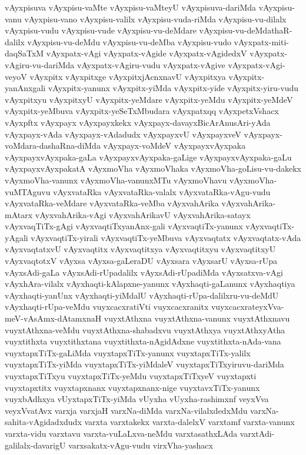 {vAyxpisuva
vAyxpisu-vaMte
vAyxpisu-vaMteyU
vAyxpisuva-dariMda
vAyxpisu-vanu
vAyxpisu-vano
vAyxpisu-valilx
vAyxpisu-vuda-riMda
vAyxpisu-vu-dilalx
vAyxpisu-vudu
vAyxpisu-vude
vAyxpisu-vu-deMdare
vAyxpisu-vu-deMdathaR-dalilx
vAyxpisu-vu-deMdu
vAyxpisu-vu-deMba
vAyxpisu-vudo
vAyxpatx-miti-daqSaTxM
vAyxpatx-vAgi
vAyxpatx-vAgide
vAyxpatx-vAgidedxV
vAyxpatx-vAgiru-vu-dariMda
vAyxpatx-vAgiru-vudu
vAyxpatx-vAgive
vAyxpatx-vAgi-veyoV
vAyxpitx
vAyxpitxge
vAyxpitxjAcnxnavU
vAyxpitxya
vAyxpitx-yanAnxgali
vAyxpitx-yanunx
vAyxpitx-yiMda
vAyxpitx-yide
vAyxpitx-yiru-vudu
vAyxpitxyu
vAyxpitxyU
vAyxpitx-yeMdare
vAyxpitx-yeMdu
vAyxpitx-yeMdeV
vAyxpitx-yeMbuva
vAyxpitx-yeSeTxMbudara
vAyxpatxqq
vAyxpetxVshacx
vAyxpftx
vAyxpayx
vAyxpayxkekx
vAyxpayx-davayxBicArAnusAri-yAda
vAyxpayx-vAda
vAyxpayx-vAdadudx
vAyxpayxvU
vAyxpayxveV
vAyxpayx-voMdara-dashaRna-diMda
vAyxpayx-voMdeV
vAyxpayxvAyxpaka
vAyxpayxvAyxpaka-gaLa
vAyxpayxvAyxpaka-gaLige
vAyxpayxvAyxpaka-gaLu
vAyxpayxvAyxpakatA
vAyxmoVha
vAyxmoVhaka
vAyxmoVha-goLisu-vu-dakekx
vAyxmoVha-vanunx
vAyxmoVha-vanunxMTu
vAyxmoVhavu
vAyxmoVha-vuMTAguvu
vAyxvataRka
vAyxvataRka-valalx
vAyxvataRka-vAgu-vudu
vAyxvataRka-veMdare
vAyxvataRka-veMba
vAyxvahArika
vAyxvahArika-mAtarx
vAyxvahArika-vAgi
vAyxvahArikavU
vAyxvahArika-satayx
vAyxvaqTiTx-gAgi
vAyxvaqtiTxyanAnx-gali
vAyxvaqtiTx-yanunx
vAyxvaqtiTx-yAgali
vAyxvaqtiTx-yirali
vAyxvaqtiTx-yeMbuva
vAyxvaqtatx
vAyxvaqtatx-vAda
vAyxvaqtatxvU
vAyxvaqtitx
vAyxvaqtitxya
vAyxvaqtitxyu
vAyxvaqtitxyU
vAyxvaqtotxV
vAyxsa
vAyxsa-gaLeraDU
vAyxsara
vAyxsarU
vAyxsa-rUpa
vAyxsAdi-gaLa
vAyxsAdi-rUpadalilx
vAyxsAdi-rUpadiMda
vAyxsatxva-vAgi
vAyxhAra-vilalx
vAyxhaqti-kAlapxne-yanunx
vAyxhaqti-gaLanunx
vAyxhaqtiya
vAyxhaqti-yanUnx
vAyxhaqti-yiMdalU
vAyxhaqti-rUpa-dalilxru-vu-deMdU
vAyxhaqti-rUpa-veMdu
vuyxcacxratiVti
vuyxcacxranitx
vuyxcacxrateyxVva-meV-vAsAmx-dAtamxnaH
vuyxtAthxna
vuyxtAthxna-vanunx
vuyxtAthxnavu
vuyxtAthxna-veMdu
vuyxtAthxna-shabadxvu
vuyxtAthxya
vuyxtAthxyAtha
vuyxtithxta
vuyxtithxtana
vuyxtithxta-nAgidAdxne
vuyxtithxta-nAda-vana
vuyxtapxTiTx-gaLiMda
vuyxtapxTiTx-yanunx
vuyxtapxTiTx-yalilx
vuyxtapxTiTx-yiMda
vuyxtapxTiTx-yiMdaleV
vuyxtapxTiTxyiruvu-dariMda
vuyxtapxTiTxyu
vuyxtapxTiTx-yeMdu
vuyxtapxTiTxyeV
vuyxtapxti
vuyxtapxtitx
vuyxtapxnanx
vuyxtapxnanx-nige
vuyxtavxTiTx-yanunx
vuyxbAdhxya
vUyxtapxTiTx-yiMda
vUyxha
vUyxha-rashimxnf
veyxVva
veyxVvatAvx
varxja
varxjaH
varxNa-diMda
varxNa-vilalxdedxMdu
varxNa-sahita-vAgidadxdudx
varxta
varxtakekx
varxta-dalelxV
varxtamf
varxta-vanunx
varxta-vidu
varxtavu
varxta-vuLaLxva-neMdu
varxtasathxLAda
varxtAdi-galilalx-davarigU
varxsakatx-vAgu-vudu
virxVha-yashacx
}
